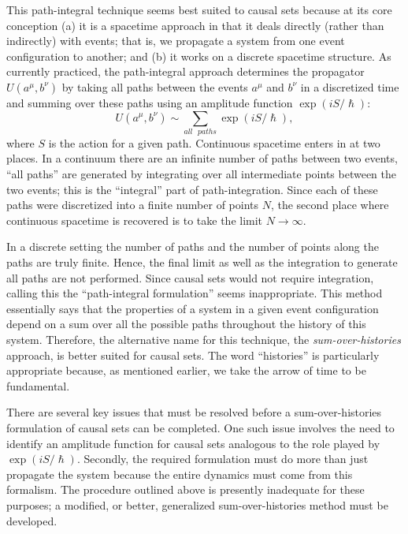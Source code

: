 \documentclass[aps,amssymb,12pt]{revtex4-2}
\begin{document}
This path-integral technique seems best suited to causal sets because at its
core conception (a) it is a spacetime approach in that it deals directly
(rather than indirectly) with events; that is, we propagate a system from
one event configuration to another; and (b) it works on a discrete spacetime
structure. As currently practiced, the path-integral approach determines the
propagator $U(a^{\mu {}},b^{\nu {}})$ by taking all paths between the events
$a^{\mu {}}$ and $b^{\nu {}}$ in a discretized time and summing over these
paths using an amplitude function $\exp (iS/\hslash )$:
\begin{equation}
U(a^{\mu {}},b^{\nu {}})\sim \sum_{all\text{ }paths}\exp (iS/\hslash ),
\label{3}
\end{equation}
where $S$ is the action for a given path. Continuous spacetime enters in at
two places. In a continuum there are an infinite number of paths between two
events, ``all paths'' are generated by integrating over all intermediate
points between the two events; this is the ``integral'' part of
path-integration. Since each of these paths were discretized into a finite
number of points $N$, the second place where continuous spacetime is
recovered is to take the limit $N\rightarrow \infty $.

In a discrete setting the number of paths and the number of points along the
paths are truly finite. Hence, the final limit as well as the integration to
generate all paths are not performed. Since causal sets would not require
integration, calling this the ``path-integral formulation'' seems
inappropriate. This method essentially says that the properties of a system
in a given event configuration depend on a sum over all the possible paths
throughout the history of this system. Therefore, the alternative name for
this technique, the {\it sum-over-histories} approach, is better suited for
causal sets. The word ``histories'' is particularly appropriate because, as
mentioned earlier, we take the arrow of time to be fundamental.

There are several key issues that must be resolved before a
sum-over-histories formulation of causal sets can be completed. One such
issue involves the need to identify an amplitude function for causal sets
analogous to the role played by $\exp (iS/\hslash )$. Secondly, the required
formulation must do more than just propagate the system because the entire
dynamics must come from this formalism. The procedure outlined above is
presently inadequate for these purposes; a modified, or better, generalized
sum-over-histories method must be developed.
\end{document}

